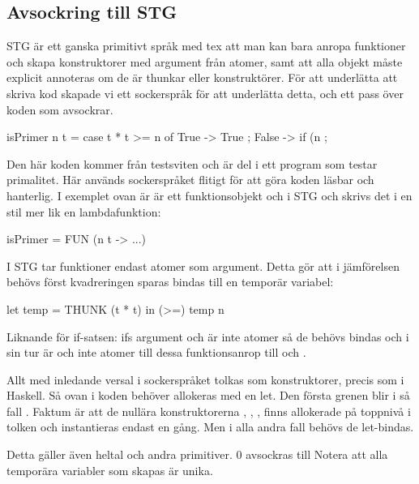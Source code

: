 \documentclass[../Core]{subfiles}
\begin{document}
\subsection{Avsockring till STG}
STG är ett ganska primitivt språk med tex att man kan bara anropa funktioner
och skapa konstruktorer med argument från atomer, samt att alla objekt måste
explicit annoteras om de är thunkar eller konstruktörer. För att underlätta
att skriva kod skapade vi ett sockerspråk för att underlätta detta, och ett
pass över koden som avsockrar.

\begin{codeEx}
isPrimer n t = case t * t >= n of
    { True -> True
    ; False -> if (n %
    };
\end{codeEx}

Den här koden kommer från testsviten och är del i ett program som testar
primalitet. Här används sockerspråket flitigt för att göra koden läsbar
och hanterlig. I exemplet ovan är  är ett funktionsobjekt och i 
STG och skrivs det i en stil mer lik en lambdafunktion:

\begin{codeEx}          
isPrimer = FUN (n t -> ...)
\end{codeEx}


I STG tar funktioner endast atomer som argument. Detta gör att 
i jämförelsen  behövs först kvadreringen sparas bindas
till en temporär variabel:

\begin{codeEx}
let temp = THUNK (t * t)
in  (>=) temp n
\end{codeEx}

Liknande för if-satsen: ifs argument  och 
 är inte atomer så de behövs bindas och i
sin tur är  och  inte atomer till dessa 
funktionsanrop till \miniCode{==} och .


Allt med inledande versal i sockerspråket tolkas som konstruktorer,
precis som i Haskell. Så  ovan i koden behöver allokeras med
en let. Den första grenen blir i så fall
  .
Faktum är att de nullära konstruktorerna , , , finns 
allokerade på toppnivå i tolken och instantieras endast en gång. 
Men i alla andra fall behövs de let-bindas.

Detta gäller även heltal och andra primitiver. $0$ avsockras till
Notera att alla temporära variabler som skapas är unika.
            
\end{document}
